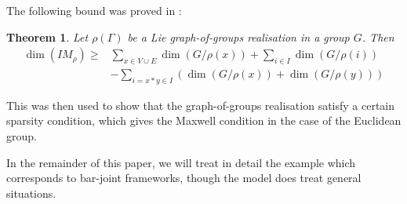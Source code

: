 \documentclass{article}
\newtheorem{theorem}{Theorem}[section]
\theoremstyle{definition}
\theoremstyle{remark}
\begin{document}
The following bound was proved in \cite{graphsofgroups}:
\begin{theorem}\label{thm: weak_maxwell}
Let $\rho(\Gamma)$ be a Lie graph-of-groups realisation in a group $G$. Then 
\begin{align*}
\dim(IM_{\rho}) \geq& \sum_{x\in V\cup E} \dim(G/ \rho(x)) +\sum_{i\in I} \dim(G/ \rho(i)) \\&- \sum_{i=x*y \in I}(\dim(G/ \rho(x)) +\dim(G/ \rho(y))) 
\end{align*}
\end{theorem}
This was then used to show that the graph-of-groups realisation satisfy a certain sparsity condition, which gives the Maxwell condition in the case of the Euclidean group. 

In the remainder of this paper, we will treat in detail the example which corresponds to bar-joint frameworks, though the model does treat general situations.
\end{document}
